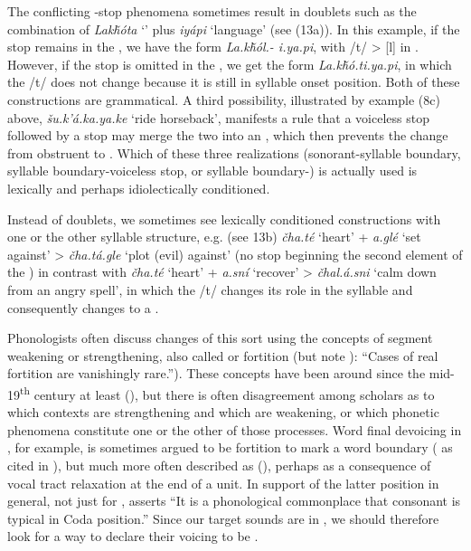 \documentclass[output=paper]{LSP/langsci}
\begin{document}
The conflicting -stop phenomena sometimes result in doublets such as the combination of \textit{Lak\v{h}\'ota} `' plus \textit{iyápi} `language' (see (13a)). In this example, if the  stop remains in the , we have the form \textit{La.k\v{h}\'ol.- i.ya.pi}, with /t/ > [l] in . However, if the  stop is omitted in the , we get the form \textit{La.k\v{h}\'o.ti.ya.pi}, in which the /t/ does not change because it is still in syllable onset position. Both of these constructions are grammatical. A third possibility, illustrated by example (8c) above, \textit{\v{s}u.k'á.ka.ya.ke} `ride horseback', manifests a rule that a voiceless stop followed by a  stop may merge the two into an , which then prevents the change from obstruent to . Which of these three realizations (sonorant-syllable boundary, syllable boundary-voiceless stop, or syllable boundary-) is actually used is lexically and perhaps idiolectically conditioned.

Instead of doublets, we sometimes see lexically conditioned constructions  
with one or the other syllable structure, e.g. (see 13b) \textit{\v{c}ha.té} `heart' + \textit{a.glé} `set against' > \textit{\v{c}ha.tá.gle} `plot (evil) against' (no  stop beginning the second element of the ) in contrast with \textit{\v{c}ha.té} `heart' + \textit{a.sní} `recover' > \textit{\v{c}hal.á.sni} `calm down from an angry spell', in which the /t/ changes its role in the syllable and consequently changes to a .

Phonologists often discuss changes of this sort using the concepts of segment weakening or strengthening, also called  or fortition (but note \citealt[10]{Honeybone2008}): ``Cases of real fortition are vanishingly rare.''). These concepts have been around since the mid-19\textsuperscript{th} century at least (\citealt{Honeybone2008}), but there is often disagreement among scholars as to which contexts are strengthening and which are weakening, or which phonetic phenomena constitute one or the other of those processes. Word final devoicing in , for example, is sometimes argued to be fortition to mark a word boundary (\citealt{IversonSalmons2007} as cited in \citealt{Harris2009}), but much more often described as  (\citealt{Harris2009}), perhaps as a consequence of vocal tract relaxation at the end of a unit. In support of the latter position in general, not just for , \citet[112]{Szigetvari2008} asserts ``It is a phonological commonplace that consonant  is typical in Coda position.'' Since our target sounds are in , we should therefore look for a way to declare their voicing to be .
\end{document}
